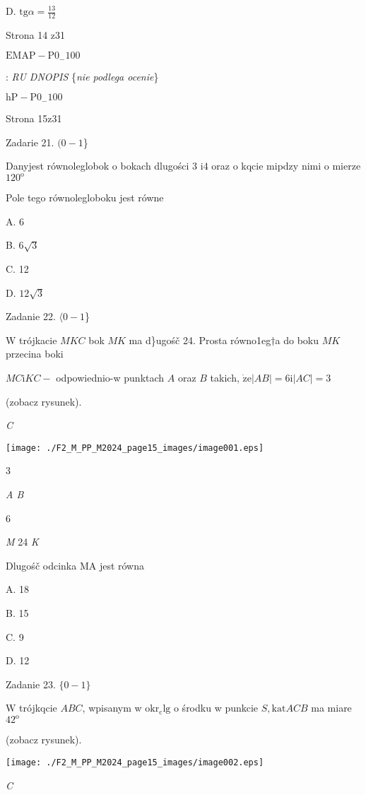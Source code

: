 \documentclass[a4paper,12pt]{article}
\begin{document}
D. $\displaystyle \mathrm{t}\mathrm{g}\alpha=\frac{13}{12}$

Strona 14 z31

$\mathrm{E}\mathrm{M}\mathrm{A}\mathrm{P}-\mathrm{P}0_{-}100$





: {\it RU DNOPIS} \{{\it nie podlega ocenie}\}

$\mathrm{h}\mathrm{P}-\mathrm{P}0_{-}100$

Strona 15z31





Zadarie 21. $(0-1$\}

Danyjest równoleglobok o bokach dlugości 3 $\mathrm{i} 4$ oraz o kqcie mipdzy nimi o mierze $120^{\mathrm{o}}$

Pole tego równolegloboku jest równe

A. 6

B. $6\sqrt{3}$

C. 12

D. $12\sqrt{3}$

Zadanie 22. $\langle 0-1$\}

$\mathrm{W}$ trójkacie $MKC$ bok $MK$ ma d\}ugośč 24. Prosta równo1eg$\dagger$a do boku $MK$ przecina boki

$MC \mathrm{i} KC -$ odpowiednio-w punktach $A$ oraz $B$ takich, $\dot{\mathrm{z}}\mathrm{e} |AB|=6 \mathrm{i} |AC|=3$

(zobacz rysunek).

{\it C}
\begin{center}
\texttt{[image: ./F2\_M\_PP\_M2024\_page15\_images/image001.eps]}
\end{center}
3

{\it A B}

6

{\it M}  24  {\it K}

Dlugośč odcinka MA jest równa

A. 18

B. 15

C. 9

D. 12

Zadanie 23. $\{0-1\}$

$\mathrm{W}$ trójkqcie $ABC$, wpisanym w $\mathrm{o}\mathrm{k}\mathrm{r}_{\mathrm{c}}\mathrm{l}\mathrm{g}$ o środku w punkcie $S, \mathrm{k}\mathrm{a}\mathrm{t} ACB$ ma miare $42^{\mathrm{o}}$

(zobacz rysunek).
\begin{center}
\texttt{[image: ./F2\_M\_PP\_M2024\_page15\_images/image002.eps]}
\end{center}
{\it C}
\end{document}
